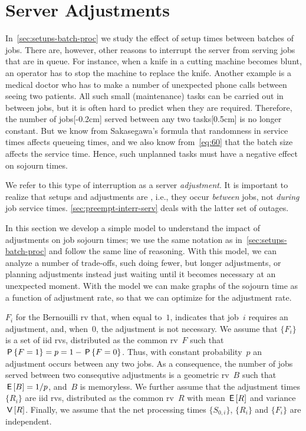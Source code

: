 \documentclass[stochastic-or.tex]{subfiles}
\begin{document}
\section{Server Adjustments}
\label{sec:non-preempt-interr}


In~\cref{sec:setups-batch-proc} we study the effect of setup times between batches of jobs.
There are, however, other reasons to interrupt the server from serving jobs that are in queue.
For instance,  when a knife in a cutting machine becomes blunt, an operator has to stop the machine to replace the knife.
Another example is a medical doctor who  has to make a number of unexpected phone calls between seeing two patients.
All such small (maintenance) tasks can be carried out in between jobs, but it is often hard to predict when they are required.
Therefore, the number of jobs[-0.2cm] served between any two tasks[0.5cm]
is no longer constant.
But we know from Sakasegawa's formula that randomness in service times affects queueing times, and we also know from~\cref{eq:60} that the batch size affects the service time.
Hence, such unplanned tasks must have a negative effect on sojourn times.

We refer to this type of interruption as a server \emph{adjustment}.
It is important to realize that setups and adjustments are , i.e., they occur \emph{between} jobs, not \emph{during} job service times. \cref{sec:preempt-interr-serv} deals with the latter set of outages.


In this section we develop a simple model to understand the impact of adjustments on job sojourn times; we use the same notation as in~\cref{sec:setups-batch-proc} and follow the same line of reasoning.
With this model, we can analyze a number of trade-offs, such doing fewer, but longer adjustments, or planning adjustments instead just waiting until it becomes necessary at an unexpected moment. With the model we can make graphs of the sojourn time as a function of adjustment rate, so that we can optimize for the adjustment rate.


 $F_{i}$ for the Bernouilli rv that, when equal to~$1$, indicates that job~$i$ requires an adjustment, and, when~$0$, the adjustment is not necessary.
We assume that $\{F_{i}\}$ is a set of iid rvs, distributed as the common rv~$F$ such that $\P{F=1} = p = 1-\P{F=0}$.
Thus, with constant probability~$p$ an adjustment occurs between any two jobs.
As a consequence, the number of jobs served between two consequtive adjustments is a geometric rv~$B$ such that $\E{B} = 1/p$, and~$B$ is memoryless.
We further assume that the adjustment times $\{R_{i}\}$ are iid rvs, distributed as the common rv~$R$ with mean $\E R$ and variance $\V R$.
Finally, we assume that the net processing times $\{S_{0,i}\}$, $\{R_{i}\}$ and $\{F_{i}\}$ are independent.
\end{document}
